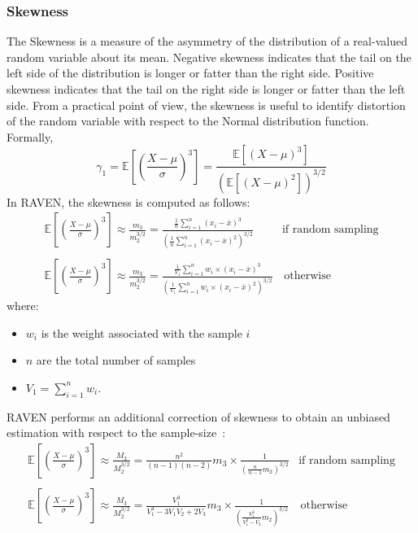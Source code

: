 \subsubsection{Skewness}
The Skewness is a measure of the asymmetry of the distribution of a 
real-valued random variable about its mean. Negative skewness 
indicates that the tail on the left side of the distribution is longer or fatter 
than the right side.  Positive skewness indicates that the tail on the right 
side is longer or fatter than the left side. From a practical point of view, the 
skewness is useful to identify distortion  of the random variable with respect to
the Normal distribution function.
\\Formally, 
\begin{equation}
\gamma_{1} = \mathbb{E} \left [ \left ( \frac{X-\mu}{\sigma} \right )^{3} \right ] = \frac{ \mathbb{E}\left [ \left ( X-\mu \right )^{3} \right ]}{\left ( \mathbb{E}\left [ \left ( X-\mu \right )^{2} \right ] \right )^{3/2}}
\end{equation}
In RAVEN, the skewness is computed as follows:
\begin{equation}
\begin{matrix}
\mathbb{E} \left [ \left ( \frac{X-\mu}{\sigma} \right )^{3} \right ]  \approx \frac{m_{3}}{m_{2}^{3/2}} = \frac{  \frac{1}{n} \sum_{i=1}^{n}  (x_{i} - \overline{x})^{3} }{\left ( \frac{1}{n} \sum_{i=1}^{n}  (x_{i} - \overline{x})^{2} \right )^{3/2}} & \text{if random sampling}
\\
\\
\mathbb{E} \left [ \left ( \frac{X-\mu}{\sigma} \right )^{3} \right ]  \approx \frac{m_{3}}{m_{2}^{3/2}} = \frac{  \frac{1}{V_{1}} \sum_{i=1}^{n} w_{i} \times (x_{i} - \overline{x})^{3} }{\left ( \frac{1}{V_{1}} \sum_{i=1}^{n}  w_{i} \times (x_{i} - \overline{x})^{2} \right )^{3/2}} &  \, \text{otherwise}
\end{matrix}
\end{equation}
where:
\begin{itemize}
  \item $w_{i}$ is the weight associated with the sample $i$
  \item $n$ are the total number of samples
  \item $V_{1} = \sum_{i=1}^{n} w_{i}$.
\end{itemize}
RAVEN performs an additional correction of skewness to obtain an unbiased estimation  with respect to the sample-size~\cite{RimoldiniUnbiased}:
\begin{equation}
\begin{matrix}
\mathbb{E} \left [ \left ( \frac{X-\mu}{\sigma} \right )^{3} \right ]  \approx \frac{M_{3}}{M_{2}^{3/2}}  = \displaystyle \frac{n^{2}}{(n-1)(n-2)}m_{3}\times \frac{1}{\left ( \displaystyle \frac{n}{n-1}m_{2}  \right )^{3/2}} & \text{if random sampling}  
\\
\\
\mathbb{E} \left [ \left ( \frac{X-\mu}{\sigma} \right )^{3} \right ]  \approx \frac{M_{3}}{M_{2}^{3/2}}  = \displaystyle \frac{V_{1}^{3}}{V_{1}^{3}-3V_{1}V_{2}+2V_{3}}m_{3} \times \frac{1}{\left ( \displaystyle \frac{V_{1}^{2}}{V_{1}^{2}-V_{2}}m_{2}  \right )^{3/2}} &  \,  \text{otherwise}
\end{matrix}
\end{equation}
